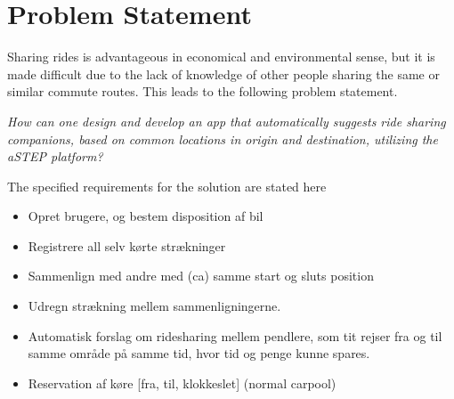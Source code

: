 \section{Problem Statement}
Sharing rides is advantageous in economical and environmental sense, but it is made difficult due to the lack of knowledge of other people sharing the same or similar commute routes.  This leads to the following problem statement.

\textit{How can one design and develop an app that automatically suggests ride sharing companions, based on common locations in origin and destination, utilizing the aSTEP platform?}



The specified requirements for the solution are stated here
\begin{itemize}
	\item Opret brugere, og bestem disposition af bil
	\item Registrere all selv kørte strækninger
	\item Sammenlign med andre med (ca) samme start og sluts position
	\item Udregn strækning mellem sammenligningerne. 
	\item Automatisk forslag om ridesharing mellem pendlere, som tit rejser fra og til samme område på samme tid, hvor tid og penge kunne spares.
	\item Reservation af køre [fra, til, klokkeslet] (normal carpool)
\end{itemize}

